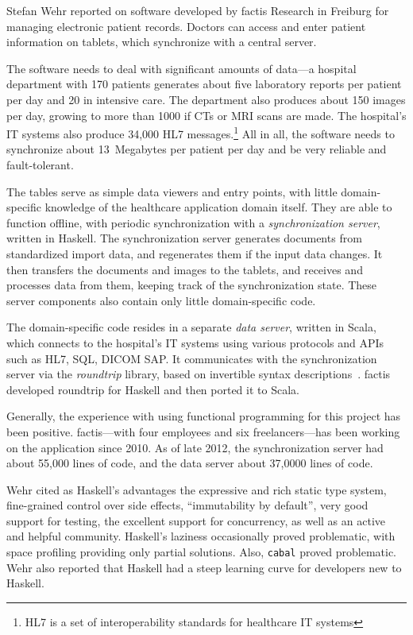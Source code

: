 \documentclass{jfp1}
\begin{document}
Stefan Wehr reported on software developed by factis Research in
Freiburg for managing electronic patient records. Doctors can access
and enter patient information on tablets, which synchronize with a central
server.

The software needs to deal with significant amounts of data---a hospital
department with 170 patients generates about five laboratory reports per
patient per day and 20 in intensive care. The department also produces
about 150 images per day, growing to more than 1000 if CTs or MRI
scans are made.  The hospital's IT systems also produce 34,000 HL7
messages.\footnote{HL7 is a set of interoperability standards for healthcare
IT systems} All in all, the software needs to synchronize about
13~Megabytes per patient per day and be very reliable and fault-tolerant.

The tables serve as simple data viewers and entry points, with little
domain-specific knowledge of the healthcare application domain itself.
They are able to function offline, with periodic synchronization with
a \textit{synchronization server}, written in Haskell.  The
synchronization server generates documents from standardized import
data, and regenerates them if the input data changes.  It then
transfers the documents and images to the tablets, and receives and
processes data from them, keeping track of the synchronization state.
These server components also contain only little domain-specific code.

The domain-specific code resides in a separate \textit{data server},
written in Scala, which connects to the hospital's IT systems using
various protocols and APIs such as HL7, SQL, DICOM SAP.  It
communicates with the synchronization server via the
\textit{roundtrip} library, based on invertible syntax
descriptions~\cite{Rendel:2010:ISD:1863523.1863525}.  factis developed
roundtrip for Haskell and then ported it to Scala.

Generally, the experience with using functional programming for this
project has been positive.  factis---with four employees and
six freelancers---has been working on the application since 2010.
As of late 2012, the synchronization server had about 55,000 lines of code, and the data
server about 37,0000 lines of code.

Wehr cited as Haskell's advantages the expressive and rich static
type system, fine-grained control over side effects, ``immutability by
default'', very good support for testing, the excellent support for
concurrency, as well as an active and helpful community.  Haskell's
laziness occasionally proved problematic, with space profiling
providing only partial solutions.  Also, {\tt cabal} proved problematic.
Wehr also reported that Haskell had a steep learning curve for developers
new to Haskell.
\end{document}
